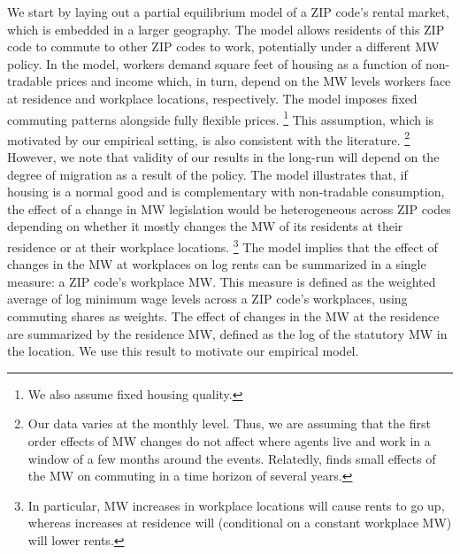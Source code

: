We start by laying out a partial equilibrium model of a ZIP code's rental market,
which is embedded in a larger geography.
The model allows residents of this ZIP code to commute to other ZIP codes to 
work, potentially under a different MW policy.
In the model, workers demand square feet of housing as a function of non-tradable 
prices and income which, in turn, depend on the MW levels workers face at 
residence and workplace locations, respectively.
The model imposes fixed commuting patterns alongside fully flexible prices.%
\footnote{We also assume fixed housing quality.}
This assumption, which is motivated by our empirical setting, is also consistent 
with the literature.%
\footnote{Our data varies at the monthly level. 
	Thus, we are assuming that the first order effects of MW changes do not affect 
	where agents live and work in a window of a few months around the events.
	Relatedly, \textcite{PerezPerez2021} finds small effects of the MW on commuting
	in a time horizon of several years.}
However, we note that validity of our results in the long-run will depend on the
degree of migration as a result of the policy.
The model illustrates that, if housing is a normal good and is complementary 
with non-tradable consumption, the effect of a change in MW legislation 
would be heterogeneous across ZIP codes depending on whether it mostly changes 
the MW of its residents at their residence or at their workplace locations.%
\footnote{In particular, MW increases in workplace locations will cause rents to 
	go up, whereas increases at residence will (conditional on a constant 
	workplace MW) will lower rents.}
The model implies that the effect of changes in the MW at workplaces on log 
rents can be summarized in a single measure: a ZIP code's workplace MW.
This measure is defined as the weighted average of log minimum wage levels 
across a ZIP code's workplaces, using commuting shares as weights.
The effect of changes in the MW at the residence are summarized by the residence 
MW, defined as the log of the statutory MW in the location.
We use this result to motivate our empirical model.


